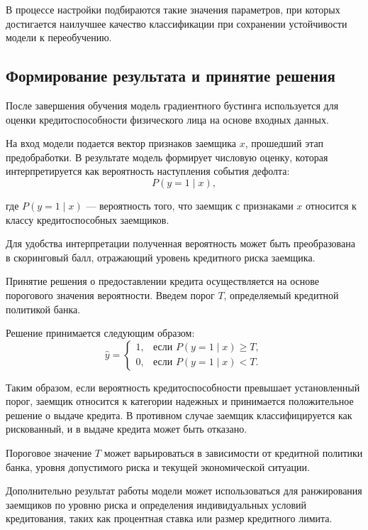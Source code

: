 В процессе настройки подбираются такие значения параметров, при которых достигается наилучшее качество классификации при сохранении устойчивости модели к переобучению.

\subsection{Формирование результата и принятие решения}

После завершения обучения модель градиентного бустинга используется для оценки кредитоспособности физического лица на основе входных данных.

На вход модели подается вектор признаков заемщика $x$, прошедший этап предобработки. В результате модель формирует числовую оценку, которая интерпретируется как вероятность наступления события дефолта:
\begin{equation}
  P(y = 1 \mid x),
\end{equation}

где $P(y = 1 \mid x)$ --- вероятность того, что заемщик с признаками $x$ относится к классу кредитоспособных заемщиков.

Для удобства интерпретации полученная вероятность может быть преобразована в скоринговый балл, отражающий уровень кредитного риска заемщика.

Принятие решения о предоставлении кредита осуществляется на основе порогового значения вероятности. Введем порог $T$, определяемый кредитной политикой банка.

Решение принимается следующим образом:
\begin{equation}
  \hat{y} =
  \begin{cases}
    1, & \text{если } P(y = 1 \mid x) \geq T, \\
    0, & \text{если } P(y = 1 \mid x) < T.
  \end{cases}
\end{equation}

Таким образом, если вероятность кредитоспособности превышает установленный порог, заемщик относится к категории надежных и принимается положительное решение о выдаче кредита. В противном случае заемщик классифицируется как рискованный, и в выдаче кредита может быть отказано.

Пороговое значение $T$ может варьироваться в зависимости от кредитной политики банка, уровня допустимого риска и текущей экономической ситуации.

Дополнительно результат работы модели может использоваться для ранжирования заемщиков по уровню риска и определения индивидуальных условий кредитования, таких как процентная ставка или размер кредитного лимита.



